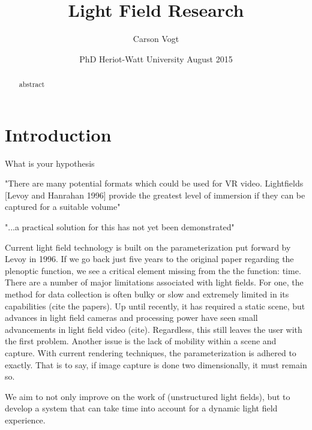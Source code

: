 \documentclass[12pt]{report}
\begin{document}
\title{Light Field Research \vspace{2.5cm}}	%
\author{
\Large Carson Vogt \vspace{1cm} \\ 
}

\date{
	\centering
	PhD \endgraf\medskip
	Heriot-Watt University \endgraf{} August 2015
}

\maketitle

\begin{abstract}
\begin{small}
abstract
\end{small}
\end{abstract}

\listoffigures

\tableofcontents

\chapter*{Introduction}
What is your hypothesis

"There are many potential formats which could be used for VR video.
Lightfields [Levoy and Hanrahan 1996] provide the greatest level of
immersion if they can be captured for a suitable volume"

"...a practical solution for this has not yet been demonstrated"

Current light field technology is built on the parameterization put forward by Levoy in 1996. If we go back just five years to the original paper regarding the plenoptic function, we see a critical element missing from the the function: time. There are a number of major limitations associated with light fields. For one, the method for data collection is often bulky or slow and extremely limited in its capabilities (cite the papers). Up until recently, it has required a static scene, but advances in light field cameras and processing power have seen small advancements in light field video (cite). Regardless, this still leaves the user with the first problem. Another issue is the lack of mobility within a scene and capture. With current rendering techniques, the parameterization is adhered to exactly. That is to say, if image capture is done two dimensionally, it must remain so. 

We aim to not only improve on the work of (unstructured light fields), but to develop a system that can take time into account for a dynamic light field experience. 
\end{document}

